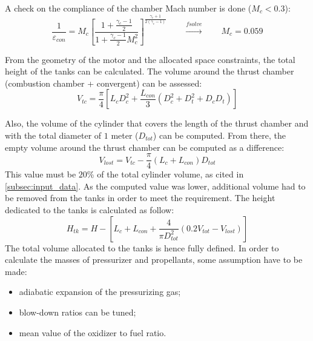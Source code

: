 

A check on the compliance of the chamber Mach number is done ($M_c < 0.3$):
\begin{equation}    
    \frac{1}{\varepsilon_{con}} = M_c \left[ \frac{1 + \frac{\gamma_c - 1}{2}}{1 + \frac{\gamma_c - 1}{2} M_c^2} \right]^{\frac{\gamma_c + 1}{2(\gamma_c - 1)}}
    \qquad \xrightarrow{\textit{fsolve}} \qquad M_c = 0.059
\end{equation}

From the geometry of the motor and the allocated space constraints, the total height of the tanks can be calculated. The volume around the thrust chamber (combustion chamber + convergent) can be assessed:
\begin{equation}
    V_{tc} = \frac{\pi}{4} \left[L_c D_c^2  + \frac{L_{con}}{3} \left(D_c^2 + D_t^2 + D_c D_t\right)\right]
    \label{eq:v_tc}
\end{equation}

Also, the volume of the cylinder that covers the length of the thrust chamber and with the total diameter of $1$ meter ($D_{tot}$) can be computed. From there, the empty volume around the thrust chamber can be computed as a difference:
\begin{equation}
    V_{lost} =  V_{tc} - \frac{\pi}{4} \left(L_{c} + L_{con}\right) D_{tot}
\end{equation}
This value must be $20$\% of the total cylinder volume, as cited in \autoref{subsec:input_data}. As the computed value was lower, additional volume had to be removed from the tanks in order to meet the requirement. The height dedicated to the tanks is calculated as follow:
\begin{equation}
    H_{tk} =  H - \left[L_{c} + L_{con} + \frac{4}{\pi D_{tot}^2}\left( 0.2 V_{tot} - V_{lost}\right) \right]
\end{equation}
The total volume allocated to the tanks is hence fully defined. 
In order to calculate the masses of pressurizer and propellants, some assumption have to be made:
\begin{itemize}
    \item adiabatic expansion of the pressurizing gas;
    \item blow-down ratios can be tuned;
    \item mean value of the oxidizer to fuel ratio.
\end{itemize}

